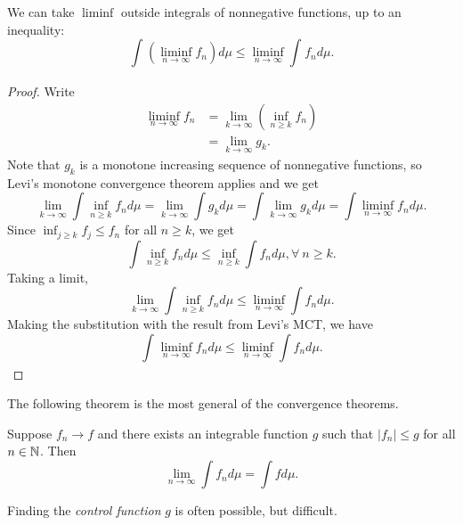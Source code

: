\begin{theorem}
	We can take $\liminf$ outside integrals of nonnegative functions, up to an inequality: \[
		\int_{}^{} \left( \liminf\limits_{n \to \infty} f_n \right)d\mu \le \liminf\limits_{n \to \infty} \int_{}^{} f_n d\mu  
	.\] 
\end{theorem}
\begin{proof}
	Write 
	\begin{align*}
		\liminf\limits_{n \to \infty} f_n &= \lim\limits_{k \to \infty} \left( \inf\limits_{n \ge k}f_n \right) \\
										  &= \lim\limits_{k \to \infty} g_k
	.\end{align*}
	Note that $g_k$ is a monotone increasing sequence of nonnegative functions, so Levi's monotone convergence theorem applies and we get \[
		\lim\limits_{k \to \infty} \int \inf_{n \ge k} f_n d\mu  = \lim\limits_{k \to \infty} \int g_k d\mu= \int \lim\limits_{k \to \infty} g_k d\mu = \int \liminf\limits_{n \to \infty} f_n d\mu
	.\] 
	Since $\inf_{j \ge k} f_j \le f_n$ for all $n \ge k$, we get \[
		\int \inf_{n \ge k} f_n d\mu \le \inf_{n \ge k} \int f_n d\mu, \forall\  n\ge k
	.\] Taking a limit, \[
		\lim\limits_{k \to \infty} \int \inf_{n \ge k} f_n d\mu \le \liminf\limits_{n \to \infty} \int f_n d\mu
	.\] Making the substitution with the result from Levi's MCT, we have \[
		\int_{}^{} \liminf\limits_{n \to \infty} f_n d\mu \le \liminf\limits_{n \to \infty} \int f_n d\mu 
	.\] 
\end{proof}

The following theorem is the most general of the convergence theorems.

\begin{theorem}
	Suppose $f_n \to f$ and there exists an integrable function $g$ such that $\left| f_n \right| \le g$ for all $n \in \mathbb{N}$.
	Then \[
		\lim\limits_{n \to \infty} \int f_n d\mu = \int f d\mu
	.\] 
\end{theorem}
Finding the \emph{control function} $g$ is often possible, but difficult.

